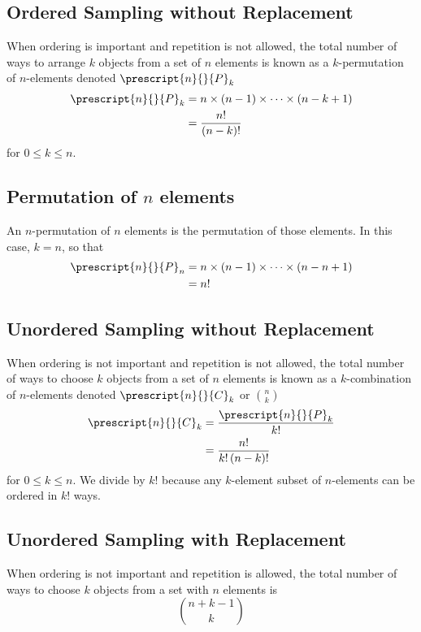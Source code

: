 \documentclass{article}
\begin{document}
\begin{multicols}{3}
    \subsection{Ordered Sampling without Replacement}
    When ordering is important and repetition is not allowed,
    the total number of ways to arrange \(k\) objects from a set of \(n\) elements is
    known as a \(k\)-permutation of \(n\)-elements denoted \(\prescript{n}{}{P}_k\)
    \begin{align*}
        \prescript{n}{}{P}_k & = n \times \left( n - 1 \right) \times \cdots \times \left( n - k + 1 \right) \\
                             & = \frac{n!}{\left( n - k \right)!}
    \end{align*}
    for \(0 \leq k \leq n\).
    \subsection{Permutation of \(n\) elements}
    An \(n\)-permutation of \(n\) elements is the permutation of those elements.
    In this case, \(k = n\), so that
    \begin{align*}
        \prescript{n}{}{P}_n & = n \times \left( n - 1 \right) \times \cdots \times \left( n - n + 1 \right) \\
                             & = n!
    \end{align*}
    \subsection{Unordered Sampling without Replacement}
    When ordering is not important and repetition is not allowed,
    the total number of ways to choose \(k\) objects from a set of \(n\) elements is
    known as a \(k\)-combination of \(n\)-elements denoted \(\prescript{n}{}{C}_k\) or \(\binom{n}{k}\)
    \begin{align*}
        \prescript{n}{}{C}_k & = \frac{\prescript{n}{}{P}_k}{k!}     \\
                             & = \frac{n!}{k! \left( n - k \right)!}
    \end{align*}
    for \(0 \leq k \leq n\). We divide by \(k!\) because any \(k\)-element subset of \(n\)-elements %
    can be ordered in \(k!\) ways. %
    \subsection{Unordered Sampling with Replacement}
    When ordering is not important and repetition is allowed,
    the total number of ways to choose \(k\) objects from a set with \(n\) elements is
    \begin{equation*}
        \binom{n + k - 1}{k}
    \end{equation*}

\end{multicols}
\end{document}
